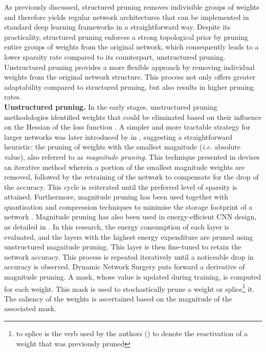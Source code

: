 As previously discussed, structured pruning removes indivisible groups of
weights and therefore yields regular network architectures that can be
implemented in standard deep learning frameworks in a straightforward way.
Despite its practicality, structured pruning enforces a strong topological prior
by pruning entire groups of weights from the original network, which
consequently leads to a lower sparsity rate compared to its counterpart,
unstructured pruning. Unstructured pruning provides a more flexible approach by
removing individual weights from the original network structure. This process
not only offers greater adaptability compared to structured pruning, but also
results in higher pruning rates.\\

\noindent\textbf{Unstructured pruning.} In the early stages, unstructured
pruning methodologies identified weights that could be eliminated based on their
influence on the Hessian of the loss function
\cite{DBLP:conf/nips/CunDS89,DBLP:conf/icnn/HassibiSW93,DBLP:conf/nips/HassibiSW93}.
A simpler and more tractable strategy for larger networks was later introduced
by \citeauthor{DBLP:conf/nips/HanPTD15} in \cite{DBLP:conf/nips/HanPTD15},
suggesting a straightforward heuristic: the pruning of weights with the smallest
magnitude (\emph{i.e.} absolute value), also referred to as \emph{magnitude
pruning}. This technique presented in \cite{DBLP:conf/nips/HanPTD15} devises an
iterative method wherein a portion of the smallest magnitude weights are
removed, followed by the retraining of the network to compensate for the drop of
the accuracy. This cycle is reiterated until the preferred level of sparsity is
attained. Furthermore, magnitude pruning has been used together with
quantisation and compression techniques to minimise the storage footprint of a
network \cite{DBLP:journals/corr/HanMD15}. Magnitude pruning has also been used
in energy-efficient \ac{CNN} design, as detailed in
\cite{DBLP:conf/cvpr/YangCS17}. In this research, the energy consumption of each
layer is evaluated, and the layers with the highest energy expenditure are
pruned using unstructured magnitude pruning. This layer is then fine-tuned to
retain the network accuracy. This process is repeated iteratively until a
noticeable drop in accuracy is observed. Dynamic Network Surgery
\cite{DBLP:conf/nips/GuoYC16} puts forward a derivative of magnitude pruning. A
mask, whose value is updated during training, is computed for each weight. This
mask is used to stochastically prune a weight or splice\footnote{to splice is
the verb used by the authors (\citeauthor{DBLP:conf/nips/GuoYC16}) to denote the
reactivation of a weight that was previously pruned} it. The saliency of the
weights is ascertained based on the magnitude of the associated mask.\\

